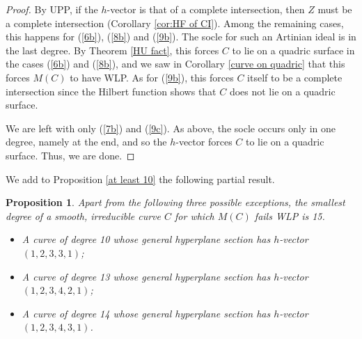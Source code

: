 \documentclass[12pt]{amsart}%
\numberwithin{equation}{section}
\newtheorem{proposition}[theorem]{Proposition}
\theoremstyle{definition}
\numberwithin{equation}{section}
\begin{document}
\begin{proof}
    By UPP, if the $h$-vector is that of a complete intersection, then $Z$ must be a complete intersection (Corollary \ref{cor:HF of CI}). Among the remaining cases, this happens for (\ref{6b}), (\ref{8b}) and (\ref{9b}). The socle for such an Artinian ideal is in the last degree. By Theorem \ref{HU fact}, this forces $C$ to lie on a quadric surface in the cases (\ref{6b}) and (\ref{8b}), and we saw in Corollary \ref{curve on quadric} that this forces $M(C)$ to have WLP. As for (\ref{9b}), this forces $C$ itself to be a complete intersection \cite{strano} since the Hilbert function shows that $C$ does not lie on a quadric surface. 

    We are left with only (\ref{7b}) and (\ref{9c}). As above, the socle occurs only in one degree, namely at the end, and so the $h$-vector forces $C$ to lie on a quadric surface. Thus,  we are done.
\end{proof}

We add to Proposition \ref{at least 10} the following partial result.

\begin{proposition} \label{< 15}
    Apart from the following three possible exceptions, the smallest degree of a smooth, irreducible curve $C$ for which $M(C)$ fails WLP is 15. 

    \begin{itemize}
        \item A curve of degree 10 whose general hyperplane section has $h$-vector $(1,2,3,3,1)$;

        \item A curve of degree 13 whose general hyperplane section has $h$-vector $(1,2,3,4,2,1)$;

        \item A curve of degree 14 whose general hyperplane section has $h$-vector $(1,2,3,4,3,1)$.
    \end{itemize}
\end{proposition}
\end{document}
